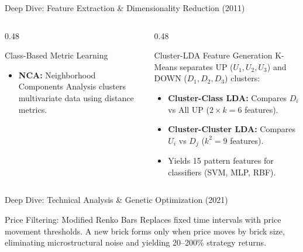 \documentclass[aspectratio=169]{beamer}
\begin{document}
\begin{frame}{Deep Dive: Feature Extraction \& Dimensionality Reduction (2011)}
	
	\begin{columns}[T]
		\begin{column}{0.48\textwidth}
			\begin{block}{Class-Based Metric Learning}
				\begin{itemize}
					\item \textbf{NCA:} Neighborhood Components Analysis clusters multivariate data using distance metrics.
				\end{itemize}
			\end{block}
		\end{column}
		\begin{column}{0.48\textwidth}
			\begin{block}{Cluster-LDA Feature Generation}
				K-Means separates UP ($U_1,U_2,U_3$) and DOWN ($D_1,D_2,D_3$) clusters:
				\begin{itemize}
					\item \textbf{Cluster-Class LDA:} Compares $D_i$ vs All UP ($2 \times k = 6$ features).
					\item \textbf{Cluster-Cluster LDA:} Compares $U_i$ vs $D_j$ ($k^2 = 9$ features).
					\item Yields 15 pattern features for classifiers (SVM, MLP, RBF).
				\end{itemize}
			\end{block}
		\end{column}
	\end{columns}
\end{frame}

\begin{frame}{Deep Dive: Technical Analysis \& Genetic Optimization (2021)}
	\begin{block}{Price Filtering: Modified Renko Bars}
		Replaces fixed time intervals with price movement thresholds. A new brick forms only when price moves by brick size, eliminating microstructural noise and yielding 20--200\% strategy returns.
	\end{block}

\end{frame}
\end{document}
